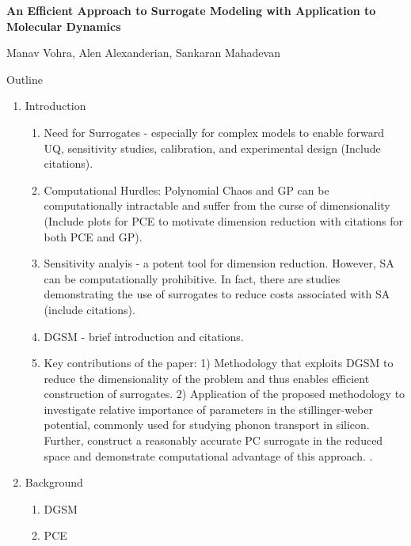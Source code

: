 \documentclass[letter,12pt]{article}
\begin{document}
\thispagestyle{empty}

\begin{center}
\begin{Large}
{\bf An Efficient Approach to Surrogate Modeling with Application to Molecular
Dynamics}\\
\end{Large}

\bigskip

Manav Vohra, Alen Alexanderian, Sankaran Mahadevan
\end{center}

\begin{large}
\noindent Outline
\end{large}

\begin{enumerate}

\item Introduction
\begin{enumerate}
\item Need for Surrogates - especially for complex models to enable forward UQ, 
sensitivity studies, calibration, and experimental design (Include citations).
\item Computational Hurdles: Polynomial Chaos and GP can be computationally 
intractable and suffer from the curse of dimensionality (Include plots for PCE
to motivate dimension reduction with citations for both PCE and GP).
\item Sensitivity analyis - a potent tool for dimension reduction. However, SA can be
computationally prohibitive. In fact, there are studies demonstrating the use of 
surrogates to reduce costs associated with SA (include citations). 
\item DGSM - brief introduction and citations. 
\item Key contributions of the paper: 1) Methodology that exploits DGSM to reduce the
dimensionality of the problem and thus enables efficient construction of surrogates.
2) Application of the proposed methodology to investigate relative importance of
parameters in the stillinger-weber potential, commonly used for studying phonon transport in silicon. Further, construct a reasonably accurate PC surrogate in the reduced 
space and demonstrate computational advantage of this approach. .
\end{enumerate}

\item Background
\begin{enumerate}
\item DGSM
\item PCE
\end{enumerate}


\end{enumerate}
\end{document}
